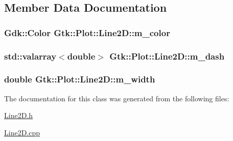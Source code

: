 \subsection{Member Data Documentation}
\hypertarget{classGtk_1_1Plot_1_1Line2D_ae322075b3cd8da490e47b3a0076d1b85}{
\subsubsection[{m\_\-color}]{\setlength{\rightskip}{0pt plus 5cm}Gdk::Color {\bf Gtk::Plot::Line2D::m\_\-color}}}
\label{classGtk_1_1Plot_1_1Line2D_ae322075b3cd8da490e47b3a0076d1b85}
\hypertarget{classGtk_1_1Plot_1_1Line2D_aa151e28045058d271b3f254cc078273e}{
\subsubsection[{m\_\-dash}]{\setlength{\rightskip}{0pt plus 5cm}std::valarray$<$double$>$ {\bf Gtk::Plot::Line2D::m\_\-dash}}}
\label{classGtk_1_1Plot_1_1Line2D_aa151e28045058d271b3f254cc078273e}
\hypertarget{classGtk_1_1Plot_1_1Line2D_a455d1610bfbfe269754464d2ba79cefb}{
\subsubsection[{m\_\-width}]{\setlength{\rightskip}{0pt plus 5cm}double {\bf Gtk::Plot::Line2D::m\_\-width}}}
\label{classGtk_1_1Plot_1_1Line2D_a455d1610bfbfe269754464d2ba79cefb}


The documentation for this class was generated from the following files:\begin{DoxyCompactItemize}
\item 
\hyperlink{Line2D_8h}{Line2D.h}\item 
\hyperlink{Line2D_8cpp}{Line2D.cpp}\end{DoxyCompactItemize}
